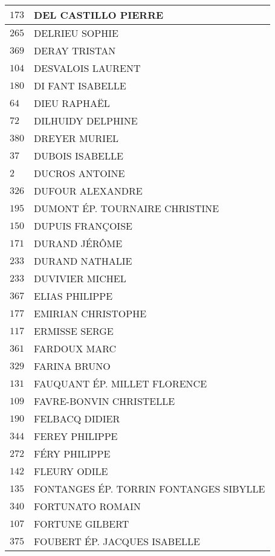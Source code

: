 \begin{xltabular}{\linewidth}{|l|X|}
    \hline
    $173$ & DEL CASTILLO PIERRE \\
    \hline
    $265$ & DELRIEU SOPHIE \\
    \hline
    $369$ & DERAY TRISTAN \\
    \hline
    $104$ & DESVALOIS LAURENT \\
    \hline
    $180$ & DI FANT ISABELLE \\
    \hline
    $64$ & DIEU RAPHAËL \\
    \hline
    $72$ & DILHUIDY DELPHINE \\
    \hline
    $380$ & DREYER MURIEL \\
    \hline
    $37$ & DUBOIS ISABELLE \\
    \hline
    $2$ & DUCROS ANTOINE \\
    \hline
    $326$ & DUFOUR ALEXANDRE \\
    \hline
    $195$ & DUMONT ÉP. TOURNAIRE CHRISTINE \\
    \hline
    $150$ & DUPUIS FRANÇOISE \\
    \hline
    $171$ & DURAND JÉRÔME \\
    \hline
    $233$ & DURAND NATHALIE \\
    \hline
    $233$ & DUVIVIER MICHEL \\
    \hline
    $367$ & ELIAS PHILIPPE \\
    \hline
    $177$ & EMIRIAN CHRISTOPHE \\
    \hline
    $117$ & ERMISSE SERGE \\
    \hline
    $361$ & FARDOUX MARC \\
    \hline
    $329$ & FARINA BRUNO \\
    \hline
    $131$ & FAUQUANT ÉP. MILLET FLORENCE \\
    \hline
    $109$ & FAVRE-BONVIN CHRISTELLE \\
    \hline
    $190$ & FELBACQ DIDIER \\
    \hline
    $344$ & FEREY PHILIPPE \\
    \hline
    $272$ & FÉRY PHILIPPE \\
    \hline
    $142$ & FLEURY ODILE \\
    \hline
    $135$ & FONTANGES ÉP. TORRIN FONTANGES SIBYLLE \\
    \hline
    $340$ & FORTUNATO ROMAIN \\
    \hline
    $107$ & FORTUNE GILBERT \\
    \hline
    $375$ & FOUBERT ÉP. JACQUES ISABELLE \\
    \hline

\end{xltabular}
